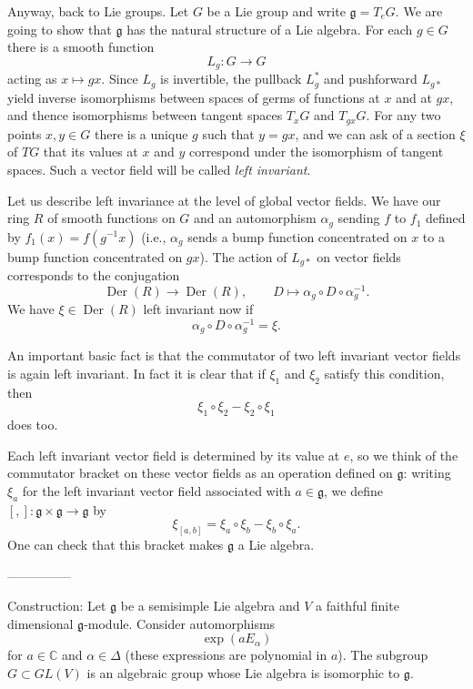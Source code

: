 \documentclass[12pt]{article}
\theoremstyle{plain}
\theoremstyle{definition}
\numberwithin{equation}{section}
\DeclareMathOperator{\Der}{Der}
\newcommand{\al}{\alpha}
\newcommand{\D}{\Delta}
\newcommand{\C}{\mathbb{C}}
\newcommand{\g}{\mathfrak{g}}
\begin{document}
Anyway, back to Lie groups. Let $G$ be a Lie group and write $\g = T_eG$. We are going to show that $\g$ has the natural structure of a Lie algebra. For each $g \in G$ there is a smooth function
\[
L_g : G \rightarrow G
\]
acting as $x \mapsto gx$. Since $L_g$ is invertible, the pullback $L_g^*$ and pushforward $L_{g*}$ yield inverse isomorphisms between spaces of germs of functions at $x$ and at $gx$, and thence isomorphisms between tangent spaces $T_xG$ and $T_{gx}G$.  For any two points $x, y \in G$ there is a unique $g$ such that $y = gx$, and we can ask of a section $\xi$ of $TG$ that its values at $x$ and $y$ correspond under the isomorphism of tangent spaces. Such a vector field will be called \emph{left invariant}.


Let us describe left invariance at the level of global vector fields. We have our ring $R$ of smooth functions on $G$ and an automorphism $\alpha_g$ sending $f$ to $f_1$ defined by $f_1(x) = f(g^{-1}x)$ (i.e., $\alpha_g$ sends a bump function concentrated on $x$ to a bump function concentrated on $gx$). The action of $L_{g*}$ on vector fields corresponds to the conjugation
\[
\Der(R) \rightarrow \Der(R), \qquad D \mapsto \alpha_g \circ D \circ \alpha_g^{-1}.
\]
We have $\xi \in \Der(R)$ left invariant now if
\[
\alpha_g \circ D \circ \alpha_g^{-1} = \xi.
\]

An important basic fact is that the commutator of two left invariant vector fields is again left invariant. In fact it is clear that if $\xi_1$ and $\xi_2$ satisfy this condition, then
\[
\xi_1 \circ \xi_2 - \xi_2 \circ \xi_1
\]
does too.

Each left invariant vector field is determined by its value at $e$, so we think of the commutator bracket on these vector fields as an operation defined on $\g$: writing $\xi_a$ for the left invariant vector field associated with $a \in \g$, we define $[,] : \g \times \g \rightarrow \g$ by
\[
\xi_{[a, b]} = \xi_a \circ \xi_b - \xi_b \circ \xi_a.
\]
One can check that this bracket makes $\g$ a Lie algebra.










---------------

Construction: Let $\g$ be a semisimple Lie algebra and $V$ a faithful finite dimensional $\g$-module. Consider automorphisms
\[
\exp(a E_\al)
\]
for $a \in \C$ and $\al \in \D$ (these expressions are polynomial in $a$). The subgroup $G \subset GL(V)$ is an algebraic group whose Lie algebra is isomorphic to $\g$.
\end{document}
